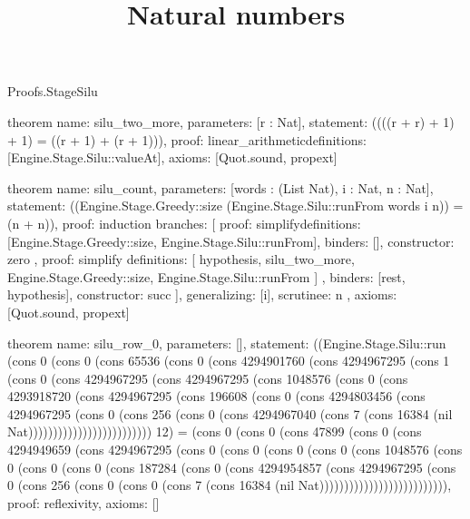 \begin{lexlean}{Proofs.StageSilu}
\title{Natural numbers}
\begin{semanticmodule}
theorem{
  name: silu_two_more,
  parameters: [r : Nat],
  statement: ((((r + r) + 1) + 1) = ((r + 1) + (r + 1))),
  proof: linear_arithmetic{definitions: [Engine.Stage.Silu::valueAt]},
  axioms: [Quot.sound, propext]
}

theorem{
  name: silu_count,
  parameters: [words : (List Nat), i : Nat, n : Nat],
  statement: ((Engine.Stage.Greedy::size (Engine.Stage.Silu::runFrom words i n)) = (n + n)),
  proof: induction{
    branches: [
      {
        proof: simplify{definitions: [Engine.Stage.Greedy::size, Engine.Stage.Silu::runFrom]},
        binders: [],
        constructor: zero
      },
      {
        proof: simplify{
          definitions: [
            hypothesis,
            silu_two_more,
            Engine.Stage.Greedy::size,
            Engine.Stage.Silu::runFrom
          ]
        },
        binders: [rest, hypothesis],
        constructor: succ
      }
    ],
    generalizing: [i],
    scrutinee: n
  },
  axioms: [Quot.sound, propext]
}

theorem{
  name: silu_row_0,
  parameters: [],
  statement: ((Engine.Stage.Silu::run (cons 0 (cons 0 (cons 65536 (cons 0 (cons 4294901760 (cons 4294967295 (cons 1 (cons 0 (cons 4294967295 (cons 4294967295 (cons 1048576 (cons 0 (cons 4293918720 (cons 4294967295 (cons 196608 (cons 0 (cons 4294803456 (cons 4294967295 (cons 0 (cons 256 (cons 0 (cons 4294967040 (cons 7 (cons 16384 (nil Nat))))))))))))))))))))))))) 12) = (cons 0 (cons 0 (cons 47899 (cons 0 (cons 4294949659 (cons 4294967295 (cons 0 (cons 0 (cons 0 (cons 0 (cons 1048576 (cons 0 (cons 0 (cons 0 (cons 187284 (cons 0 (cons 4294954857 (cons 4294967295 (cons 0 (cons 256 (cons 0 (cons 0 (cons 7 (cons 16384 (nil Nat)))))))))))))))))))))))))),
  proof: reflexivity{},
  axioms: []
}
\end{semanticmodule}
\end{lexlean}
